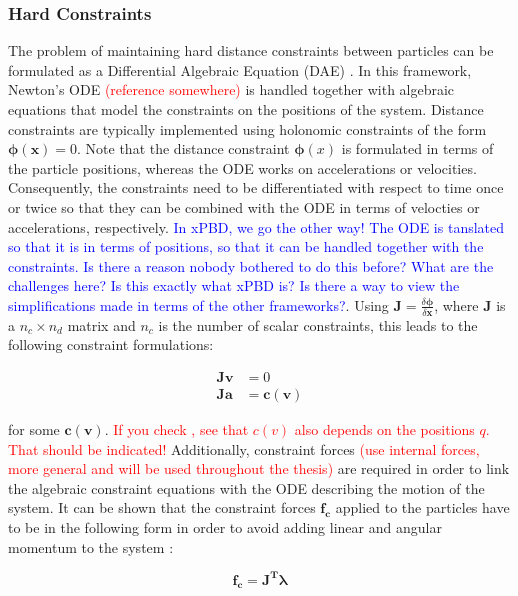 \subsubsection{Hard Constraints}\label{sss:hard-constraints}
The problem of maintaining hard distance constraints between particles can be formulated as a Differential Algebraic Equation (DAE)
\cite{ascher1995, baraff1996}. In this framework, Newton's ODE \textcolor{red}{(reference somewhere)} is handled together with 
algebraic equations that model the constraints on the positions of the system. Distance constraints are typically implemented using 
holonomic constraints 
of the form $\bm{\phi(x)} = 0$. Note that the distance constraint $\bm{\phi}(x)$ is formulated in terms of the particle positions, 
whereas the ODE works on accelerations or velocities. Consequently, the constraints need to be differentiated with respect to time
once or twice so that they can be 
combined with the ODE in terms of velocties or accelerations, respectively. \textcolor{blue}{In xPBD, we go the other way! The ODE
is tanslated so that it is in terms of positions, so that it can be handled together with the constraints. Is there a reason nobody 
bothered to
do this before? What are the challenges here? Is this exactly what xPBD is? Is there a way to view the simplifications made in 
terms of the other frameworks?}. Using $\bm{J} = \frac{\delta \bm{\phi}}{\delta \bm{x}}$, where $\bm{J}$ is a $n_c \times n_d$ matrix
and $n_c$ is the number of scalar constraints, this leads to the following constraint formulations:

\begin{align*}
    \bm{Jv} &= 0 \\
    \bm{Ja} &= \bm{c(v)}
\end{align*}

for some $\bm{c(v)}$. \textcolor{red}{If you check \cite{ascher1995}, see that $c(v)$ also depends on the positions $q$. That should 
be indicated!} 
Additionally, constraint forces \textcolor{red}{(use internal forces, more general and will be used throughout the thesis)} are 
required in order to link the algebraic constraint equations with the ODE describing the motion of 
the system. It can be shown that the constraint forces $\bm{f_c}$ applied to the particles have to be in the following form in order to 
avoid adding linear and angular momentum to the system \cite{baraff1996}:

\begin{equation}\label{eq:constraint-forces}
    \bm{f_c} = \bm{J^T \lambda}
\end{equation}

